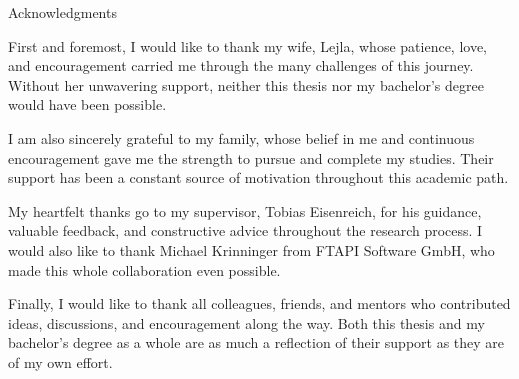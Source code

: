 \thispagestyle{empty}

\vspace*{20mm}

\begin{center}
{ Acknowledgments}
\end{center}

\vspace{10mm}

First and foremost, I would like to thank my wife, Lejla, whose patience, love, and encouragement carried me through the many challenges of this journey. Without her unwavering support, neither this thesis nor my bachelor's degree would have been possible.

I am also sincerely grateful to my family, whose belief in me and continuous encouragement gave me the strength to pursue and complete my studies. Their support has been a constant source of motivation throughout this academic path.

My heartfelt thanks go to my supervisor, Tobias Eisenreich, for his guidance, valuable feedback, and constructive advice throughout the research process. I would also like to thank Michael Krinninger from FTAPI Software GmbH, who made this whole collaboration even possible.

Finally, I would like to thank all colleagues, friends, and mentors who contributed ideas, discussions, and encouragement along the way. Both this thesis and my bachelor's degree as a whole are as much a reflection of their support as they are of my own effort.

\cleardoublepage{}